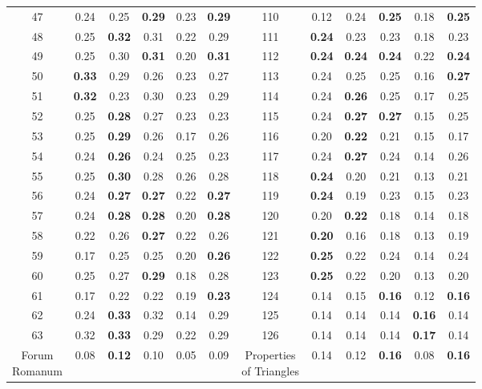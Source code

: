 \documentclass{article}
\begin{document}
{\begin{longtable}{cccccc@{\qquad}cccccc}
47 & 0.24 & 0.25 & \textbf{0.29} & 0.23 & \textbf{0.29} & 110 & 0.12 & 0.24 & \textbf{0.25} & 0.18 & \textbf{0.25} \\
48 & 0.25 & \textbf{0.32} & 0.31 & 0.22 & 0.29 & 111 & \textbf{0.24} & 0.23 & 0.23 & 0.18 & 0.23 \\
49 & 0.25 & 0.30 & \textbf{0.31} & 0.20 & \textbf{0.31} & 112 & \textbf{0.24} & \textbf{0.24} & \textbf{0.24} & 0.22 & \textbf{0.24} \\
50 & \textbf{0.33} & 0.29 & 0.26 & 0.23 & 0.27 & 113 & 0.24 & 0.25 & 0.25 & 0.16 & \textbf{0.27} \\
51 & \textbf{0.32} & 0.23 & 0.30 & 0.23 & 0.29 & 114 & 0.24 & \textbf{0.26} & 0.25 & 0.17 & 0.25 \\
52 & 0.25 & \textbf{0.28} & 0.27 & 0.23 & 0.23 & 115 & 0.24 & \textbf{0.27} & \textbf{0.27} & 0.15 & 0.25 \\
53 & 0.25 & \textbf{0.29} & 0.26 & 0.17 & 0.26 & 116 & 0.20 & \textbf{0.22} & 0.21 & 0.15 & 0.17 \\
54 & 0.24 & \textbf{0.26} & 0.24 & 0.25 & 0.23 & 117 & 0.24 & \textbf{0.27} & 0.24 & 0.14 & 0.26 \\
55 & 0.25 & \textbf{0.30} & 0.28 & 0.26 & 0.28 & 118 & \textbf{0.24} & 0.20 & 0.21 & 0.13 & 0.21 \\
56 & 0.24 & \textbf{0.27} & \textbf{0.27} & 0.22 & \textbf{0.27} & 119 & \textbf{0.24} & 0.19 & 0.23 & 0.15 & 0.23 \\
57 & 0.24 & \textbf{0.28} & \textbf{0.28} & 0.20 & \textbf{0.28} & 120 & 0.20 & \textbf{0.22} & 0.18 & 0.14 & 0.18 \\
58 & 0.22 & 0.26 & \textbf{0.27} & 0.22 & 0.26 & 121 & \textbf{0.20} & 0.16 & 0.18 & 0.13 & 0.19 \\
59 & 0.17 & 0.25 & 0.25 & 0.20 & \textbf{0.26} & 122 & \textbf{0.25} & 0.22 & 0.24 & 0.14 & 0.24 \\
60 & 0.25 & 0.27 & \textbf{0.29} & 0.18 & 0.28 & 123 & \textbf{0.25} & 0.22 & 0.20 & 0.13 & 0.20 \\
61 & 0.17 & 0.22 & 0.22 & 0.19 & \textbf{0.23} & 124 & 0.14 & 0.15 & \textbf{0.16} & 0.12 & \textbf{0.16} \\
62 & 0.24 & \textbf{0.33} & 0.32 & 0.14 & 0.29 & 125 & 0.14 & 0.14 & 0.14 & \textbf{0.16} & 0.14 \\
63 & 0.32 & \textbf{0.33} & 0.29 & 0.22 & 0.29 & 126 & 0.14 & 0.14 & 0.14 & \textbf{0.17} & 0.14 \\
\makecell[c]{Forum \\ Romanum} & 0.08 & \textbf{0.12} & 0.10 & 0.05 & 0.09 & \makecell[c]{Properties \\ of Triangles} & 0.14 & 0.12 & \textbf{0.16} & 0.08 & \textbf{0.16} \\

\end{longtable}}
\end{document}
